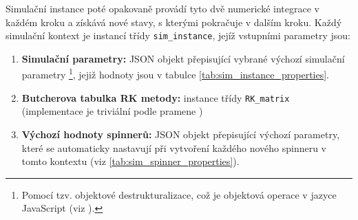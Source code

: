 Simulační instance poté opakovaně provádí tyto dvě numerické integrace v každém kroku a získává nové stavy, s kterými pokračuje v dalším kroku. Každý simulační kontext je instancí třídy \texttt{sim\_instance}, jejíž vstupními parametry jsou:
\begin{enumerate}
    \item \textbf{Simulační parametry:} JSON objekt přepisující vybrané výchozí simulační parametry \footnote{Pomocí tzv. objektové destrukturalizace, což je objektová operace v jazyce JavaScript (viz \cite{JS_deconstruction}).}, jejiž hodnoty jsou v tabulce \ref{tab:sim_instance_properties}.
    \item \textbf{Butcherova tabulka RK metody:} instance třídy \texttt{RK\_matrix} (implementace je triviální podle pramene \cite{Butcher_tab_def})
    \item \textbf{Výchozí hodnoty spinnerů:} JSON objekt přepisující výchozí parametry, které se automaticky nastavují při vytvoření každého nového spinneru v tomto kontextu (viz \autoref{tab:sim_spinner_properties}).
\end{enumerate}

\clearpage

